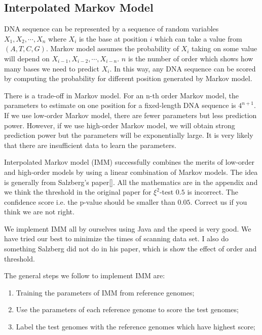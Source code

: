 \documentclass[12pt]{article} %
\begin{document}
\subsection{Interpolated Markov Model}
DNA sequence can be represented by a sequence of random variables $X_1, X_2, \cdots, X_n$ where $X_i$ is the base at position $i$ which can take a value from $(A, T, C, G)$. Markov model assumes the probability of $X_i$ taking on some value will depend on $X_{i-1}, X_{i-2}, \cdots, X_{i-n}$. $n$ is the number of order which shows how many bases we need to predict $X_i$. In this way, any DNA sequence can be scored by computing the probability for different position generated by Markov model. 
\par
There is a trade-off in Markov model. For an n-th order Markov model, the parameters to estimate on one position for a fixed-length DNA sequence is $4^{n+1}$. If we use low-order Markov model, there are fewer parameters but less prediction power. However, if we use high-order Markov model, we will obtain strong prediction power but the parameters will be exponentially large. It is very likely that there are insufficient data to learn the parameters. 
\par
Interpolated Markov model (IMM) successfully combines the merits of low-order and high-order models by using a linear combination of Markov models. The idea is generally from Salzberg's paper[\cite{Salzberg:1998dg}]. All the mathematics are in the appendix and we think the threshold in the original paper for $\xi^2$-test $0.5$ is incorrect. The confidence score i.e. the p-value should be smaller than $0.05$. Correct us if you think we are not right. 
\par
We implement IMM all by ourselves using Java and the speed is very good. We have tried our best to minimize the times of scanning data set. I also do something Salzberg did not do in his paper, which is show the effect of order and threshold. 

The general steps we follow to implement IMM are:

\begin{enumerate}
\item Training the parameters of IMM from reference genomes;
\item Use the parameters of each reference genome to score the test genomes;
\item Label the test genomes with the reference genomes which have highest score;
\end{enumerate}
\end{document}
